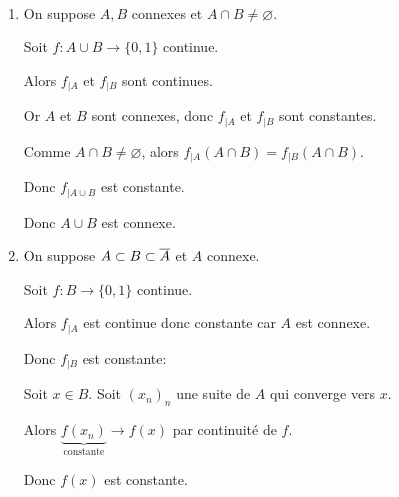 \documentclass[french,a4paper,10pt]{article}
\begin{document}
	\begin{myproof}\,
		\begin{enumerate}[label=\arabic*)]
			\item On suppose $A, B$ connexes et $A\cap B\ne\varnothing$.

			Soit $f\colon A\cup B\to\{0,1\}$ continue.

			Alors $f_{|A}$ et $f_{|B}$ sont continues.

			Or $A$ et $B$ sont connexes, donc $f_{|A}$ et $f_{|B}$ sont constantes.

			Comme $A\cap B\ne\varnothing$, alors $f_{|A}(A\cap B)=f_{|B}(A\cap B)$.

			Donc $f_{|A\cup B}$ est constante.

			Donc $A\cup B$ est connexe.

		\item On suppose $A\subset B\subset \overline{A}$ et $A$ connexe.

			Soit $f\colon B\to\{0,1\}$ continue.

			Alors $f_{|A}$ est continue donc constante car $A$ est connexe.

			Donc $f_{|B}$ est constante:

			Soit $x\in B$. Soit ${(x_n)}_n$ une suite de $A$ qui converge vers $x$.

			Alors $\underbrace{f(x_n)}_{\text{constante}}\to f(x)$ par continuité de $f$.

			Donc $f(x)$ est constante.
		\end{enumerate}
	\end{myproof}
\end{document}
